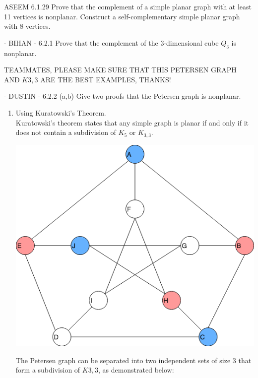 \documentclass[12pt]{article}
\newenvironment{question}[2][Question]{\begin{trivlist}
\item[\hskip \labelsep {\bfseries #1}\hskip \labelsep {\bfseries #2.}]}{\end{trivlist}}
\begin{document}
\begin{question}{3} \color{blue} ASEEM \color{black}
 6.1.29  Prove that the complement of a simple planar graph with at least 11 vertices is nonplanar.  Construct a self-complementary simple planar graph with 8 vertices.
\end{question}

\begin{question}{4} - \color{blue}BIHAN\color{black} - 
6.2.1  Prove that the complement of the 3-dimensional cube $Q_3$ is nonplanar.
\end{question}
\large\color{red}TEAMMATES, PLEASE MAKE SURE THAT THIS PETERSEN GRAPH AND $K{3,3}$ ARE THE BEST EXAMPLES, THANKS!
\color{black}\ \normalsize
\begin{question}{5}  - \color{blue}DUSTIN\color{black} - 
6.2.2 (a,b) Give two proofs that the Petersen graph is nonplanar.
\begin{enumerate}[label=\alph*)]
  \item Using Kuratowski's Theorem.   \\
  Kuratowski's theorem states that any simple graph is planar if and only if it does not contain a subdivision of $K_5$ or $K_{3,3}$.
  \begin{center}
    \includegraphics[scale=.45]{petersen}
  \end{center}
  The Petersen graph can be separated into two independent sets of size 3 that form a subdivision of $K{3,3}$, as demonstrated below:
  \begin{center}

\end{center}
\end{enumerate}
\end{question}
\end{document}
